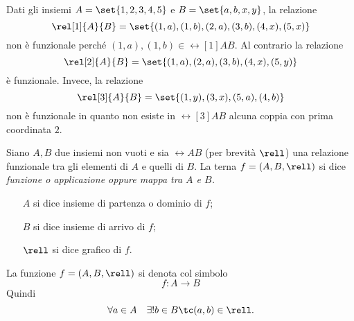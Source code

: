 \begin{example}
    Dati gli insiemi \(A = \set{1, 2, 3, 4, 5}\) e \(B = \set{a, b, x, y}\), la relazione
    \[
        \rel[1]{A}{B} = \set{(1, a), (1, b), (2, a), (3, b), (4, x), (5, x)}
    \]
    non è funzionale perché \((1, a), (1, b) \in \rel[1]{A}{B}\). Al contrario la relazione
    \[
        \rel[2]{A}{B} = \set{(1, a), (2, a), (3, b), (4, x), (5, y)}
    \]
    è funzionale. Invece, la relazione
    \[
        \rel[3]{A}{B} = \set{(1, y), (3, x), (5, a), (4, b)}
    \]
    non è funzionale in quanto non esiste in \(\rel[3]{A}{B}\) alcuna coppia con prima coordinata \(2\).
\end{example}

\begin{definition}[funzione]\label{def:funzione}
    Siano \(A,B\) due insiemi non vuoti e sia \(\rel{A}{B}\) (per brevità
    \(\rell\)) una relazione funzionale tra gli elementi di \(A\) e quelli di
    \(B\). La terna \(f = (A, B, \rell)\) si dice \em{funzione} o
    \em{applicazione} oppure \em{mappa} tra \(A\) e \(B\).

    \begin{itemize}
        \item[\(A\)] si dice insieme di partenza o dominio di \(f\);
        \item[\(B\)] si dice insieme di arrivo di \(f\);
        \item[\(\rell\)] si dice grafico di \(f\).
    \end{itemize}
    La funzione \(f = (A, B, \rell)\) si denota col simbolo
    \[
        f\colon A \to B
    \]
    Quindi
    \[
        \forall a \in A \quad \exists! b \in B \tc (a, b) \in \rell.
    \]
\end{definition}

